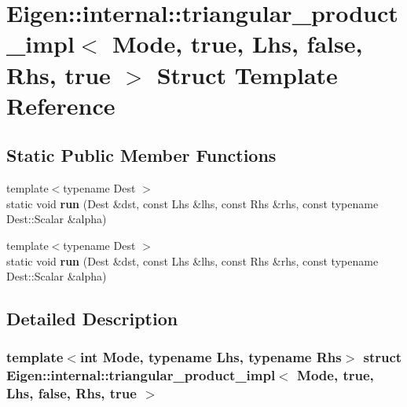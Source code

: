\hypertarget{struct_eigen_1_1internal_1_1triangular__product__impl_3_01_mode_00_01true_00_01_lhs_00_01false_00_01_rhs_00_01true_01_4}{}\section{Eigen\+:\+:internal\+:\+:triangular\+\_\+product\+\_\+impl$<$ Mode, true, Lhs, false, Rhs, true $>$ Struct Template Reference}
\label{struct_eigen_1_1internal_1_1triangular__product__impl_3_01_mode_00_01true_00_01_lhs_00_01false_00_01_rhs_00_01true_01_4}
\subsection*{Static Public Member Functions}
\begin{DoxyCompactItemize}
\item 
\mbox{\label{struct_eigen_1_1internal_1_1triangular__product__impl_3_01_mode_00_01true_00_01_lhs_00_01false_00_01_rhs_00_01true_01_4_ad9ba4ee44cda8a75940959ff40a055b8}} 
{\footnotesize template$<$typename Dest $>$ }\\static void {\bfseries run} (Dest \&dst, const Lhs \&lhs, const Rhs \&rhs, const typename Dest\+::\+Scalar \&alpha)
\item 
\mbox{\label{struct_eigen_1_1internal_1_1triangular__product__impl_3_01_mode_00_01true_00_01_lhs_00_01false_00_01_rhs_00_01true_01_4_ad9ba4ee44cda8a75940959ff40a055b8}} 
{\footnotesize template$<$typename Dest $>$ }\\static void {\bfseries run} (Dest \&dst, const Lhs \&lhs, const Rhs \&rhs, const typename Dest\+::\+Scalar \&alpha)
\end{DoxyCompactItemize}


\subsection{Detailed Description}
\subsubsection*{template$<$int Mode, typename Lhs, typename Rhs$>$\newline
struct Eigen\+::internal\+::triangular\+\_\+product\+\_\+impl$<$ Mode, true, Lhs, false, Rhs, true $>$}




